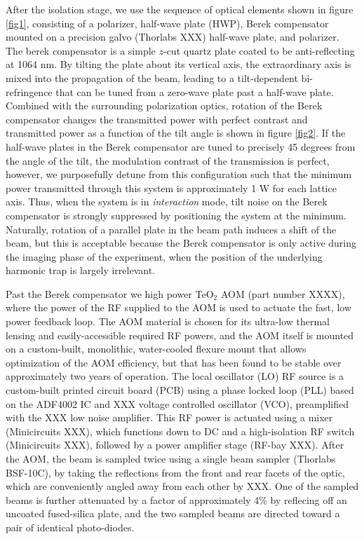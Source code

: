 \documentclass[twocolumn,aps,pra,showpacs,preprintnumbers,bibnotes]{revtex4-1}
\begin{document}
After the isolation stage, we use the sequence of optical elements shown in figure \ref{fig1}, consisting of a polarizer, half-wave plate (HWP), Berek compensator mounted on a precision galvo (Thorlabs XXX) half-wave plate, and polarizer. The berek compensator is a simple $z$-cut quartz plate coated to be anti-reflecting at 1064 nm. 
By tilting the plate about its vertical axis, the extraordinary axis is mixed into the propagation of the beam, leading to a tilt-dependent bi-refringence that can be tuned from a zero-wave plate past a half-wave plate.
Combined with the surrounding polarization optics, rotation of the Berek compensator changes the transmitted power with perfect contrast and transmitted power as a function of the tilt angle is shown in figure \ref{fig2}.
If the half-wave plates in the Berek compensator are tuned to precisely 45 degrees from the angle of the tilt, the modulation contrast of the transmission is perfect, however, we purposefully detune from this configuration such that the minimum power transmitted through this system is approximately 1 W for each lattice axis. 
Thus, when the system is in \textit{interaction} mode, tilt noise on the Berek compensator is strongly suppressed by positioning the system at the minimum.
Naturally, rotation of a parallel plate in the beam path induces a shift of the beam, but this is acceptable because the Berek compensator is only active during the imaging phase of the experiment, when the position of the underlying harmonic trap is largely irrelevant.

Past the Berek compensator we high power TeO$_2$ AOM (part number XXXX), where the power of the RF supplied to the AOM is used to actuate the fast, low power feedback loop.
The AOM material is chosen for its ultra-low thermal lensing and easily-accessible required RF powers, and the AOM itself is mounted on a custom-built, monolithic, water-cooled flexure mount that allows optimization of the AOM efficiency, but that has been found to be stable over approximately two years of operation.
The local oscillator (LO) RF source is a custom-built printed circuit board (PCB) using a phase locked loop (PLL) based on the ADF4002 IC and XXX voltage controlled oscillator (VCO), preamplified with the XXX low noise amplifier. 
This RF power is actuated using a mixer (Minicircuits XXX), which functions down to DC and a high-isolation RF switch (Minicircuits XXX), followed by a power amplifier stage (RF-bay XXX). After the AOM, the beam is sampled twice using a single beam sampler (Thorlabs BSF-10C), by taking the reflections from the front and rear facets of the optic, which are conveniently angled away from each other by XXX.
One of the sampled beams is further attenuated by a factor of approximately 4\% by reflecing off an uncoated fused-silica plate, and the two sampled beams are directed toward a pair of identical photo-diodes. 
\end{document}
